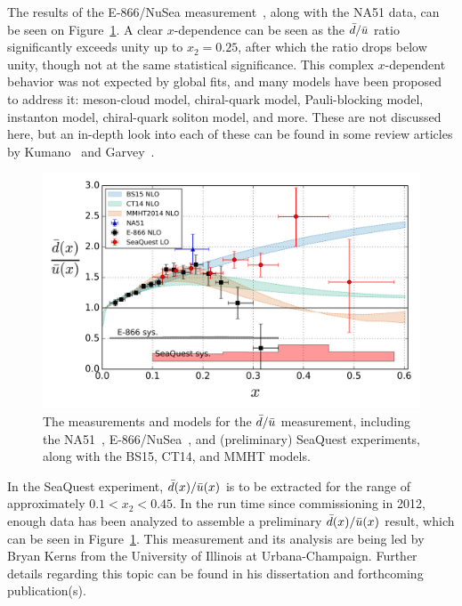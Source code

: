 The results of the E-866/NuSea measurement~\cite{PhysRevLett.80.3715}, along with the NA51 data, can be seen on Figure~\ref{fig:dbar-ubar}. A clear $x$-dependence can be seen as the $\bar{d}/\bar{u}$ ratio significantly exceeds unity up to $x_2=0.25$, after which the ratio drops below unity, though not at the same statistical significance. This complex $x$-dependent behavior was not expected by global fits, and many models have been proposed to address it: meson-cloud model, chiral-quark model, Pauli-blocking model, instanton model, chiral-quark soliton model, and more. These are not discussed here, but an in-depth look into each of these can be found in some review articles by Kumano~\cite{Kumano:1997cy} and Garvey~\cite{Garvey:2001yq}.

\begin{figure}
	\centering
	\includegraphics[width=\textwidth]{figures/background/dbar_ubar.png}
	\caption{The measurements and models for the $\bar{d}/\bar{u}$ measurement, including the NA51~\cite{Baldit:1994jk}, E-866/NuSea~\cite{PhysRevLett.80.3715}, and (preliminary) SeaQuest experiments, along with the BS15, CT14, and MMHT models.}
	\label{fig:dbar-ubar}
\end{figure}

In the SeaQuest experiment, $\bar{d}(x)/\bar{u}(x)$ is to be extracted for the range of approximately $0.1<x_2<0.45$. In the run time since commissioning in 2012, enough data has been analyzed to assemble a preliminary $\bar{d}(x)/\bar{u}(x)$ result, which can be seen in Figure~\ref{fig:dbar-ubar}. This measurement and its analysis are being led by Bryan Kerns from the University of Illinois at Urbana-Champaign. Further details regarding this topic can be found in his dissertation and forthcoming publication(s).

